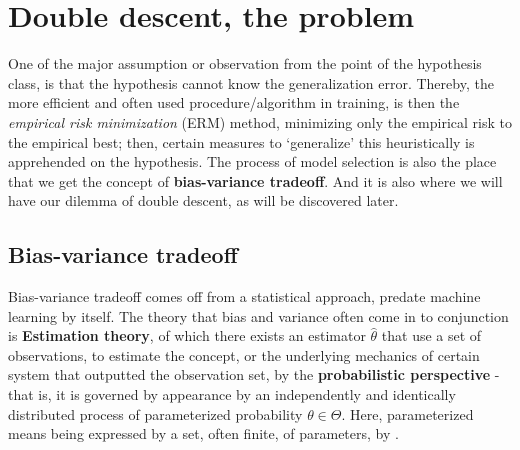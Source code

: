 \section{Double descent, the problem}

One of the major assumption or observation from the point of the hypothesis class, is that the hypothesis cannot know the generalization error. Thereby, the more efficient and often used procedure/algorithm in training, is then the \textit{empirical risk minimization} (ERM) method, minimizing only the empirical risk to the empirical best; then, certain measures to `generalize' this heuristically is apprehended on the hypothesis. The process of model selection is also the place that we get the concept of \textbf{bias-variance tradeoff}. And it is also where we will have our dilemma of double descent, as will be discovered later. 

\subsection{Bias-variance tradeoff}

Bias-variance tradeoff comes off from a statistical approach, predate machine learning by itself. The theory that bias and variance often come in to conjunction is \textbf{Estimation theory}, of which there exists an estimator $\hat{\theta}$ that use a set of observations, to estimate the concept, or the underlying mechanics of certain system that outputted the observation set, by the \textbf{probabilistic perspective} - that is, it is governed by appearance by an independently and identically distributed process of parameterized probability $\theta\in \Theta$. Here, parameterized means being expressed by a set, often finite, of parameters, by \cite{LehmannCasella_theory_1998,liam_statistics_2005}. 
